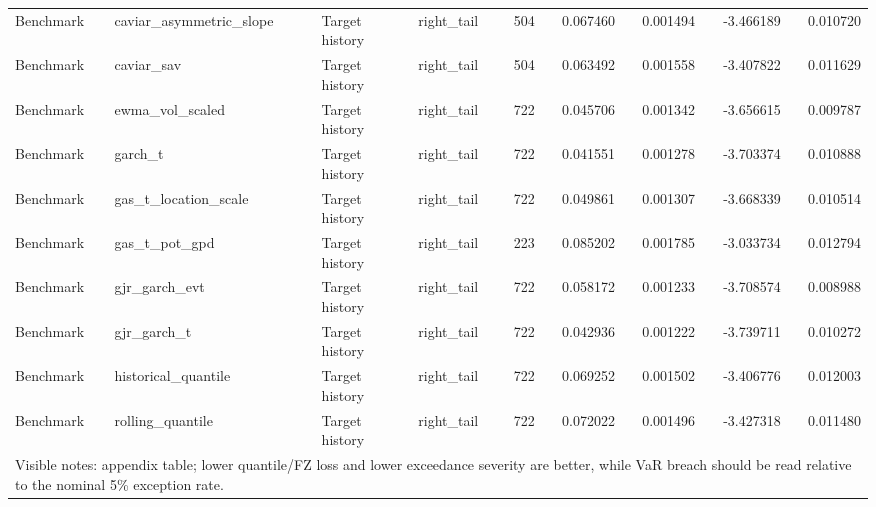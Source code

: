 \begin{tabular}{lll lrrrrr}
Benchmark & caviar\_asymmetric\_slope & Target history & right\_tail & 504 & 0.067460 & 0.001494 & -3.466189 & 0.010720 \\
Benchmark & caviar\_sav & Target history & right\_tail & 504 & 0.063492 & 0.001558 & -3.407822 & 0.011629 \\
Benchmark & ewma\_vol\_scaled & Target history & right\_tail & 722 & 0.045706 & 0.001342 & -3.656615 & 0.009787 \\
Benchmark & garch\_t & Target history & right\_tail & 722 & 0.041551 & 0.001278 & -3.703374 & 0.010888 \\
Benchmark & gas\_t\_location\_scale & Target history & right\_tail & 722 & 0.049861 & 0.001307 & -3.668339 & 0.010514 \\
Benchmark & gas\_t\_pot\_gpd & Target history & right\_tail & 223 & 0.085202 & 0.001785 & -3.033734 & 0.012794 \\
Benchmark & gjr\_garch\_evt & Target history & right\_tail & 722 & 0.058172 & 0.001233 & -3.708574 & 0.008988 \\
Benchmark & gjr\_garch\_t & Target history & right\_tail & 722 & 0.042936 & 0.001222 & -3.739711 & 0.010272 \\
Benchmark & historical\_quantile & Target history & right\_tail & 722 & 0.069252 & 0.001502 & -3.406776 & 0.012003 \\
Benchmark & rolling\_quantile & Target history & right\_tail & 722 & 0.072022 & 0.001496 & -3.427318 & 0.011480 \\
\midrule
\multicolumn{9}{l}{\footnotesize Visible notes: appendix table; lower quantile/FZ loss and lower exceedance severity are better, while VaR breach should be read relative to the nominal 5\% exception rate.} \\
\bottomrule
\end{tabular}
